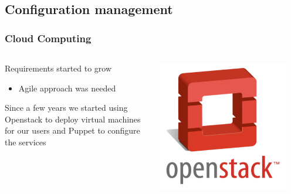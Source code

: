 \documentclass[aspectratio=169]{beamer}
\begin{document}

\subsection{Configuration management}
\begin{frame}
    \frametitle{Cloud Computing}
    \begin{minipage}[t]{0.95\textwidth}
        \begin{columns}
            \begin{column}{0.8\textwidth}
                Requirements started to grow
                \begin{itemize}
                    \item Agile approach was needed
                \end{itemize}
                Since a few years we started using Openstack to deploy virtual
                machines for our users and Puppet to configure the services 
            \end{column}
            \begin{column}{0.2\textwidth}
                \includegraphics[width=0.9\textwidth]{openstack-logo512.png}
            \end{column}
        \end{columns}
    \end{minipage}
    \vspace{\belowdisplayskip}

\end{frame}
\end{document}
